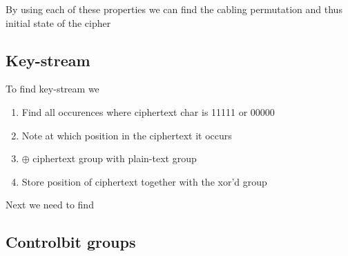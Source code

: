 \documentclass{article}
\begin{document}
By using each of these properties we can find the cabling permutation and thus initial state of the cipher

\subsection{Key-stream}

To find key-stream we
\begin{enumerate}
	\item Find all occurences where ciphertext char is 11111 or 00000
	\item Note at which position in the ciphertext it occurs
	\item $\oplus$ ciphertext group with plain-text group
	\item Store position of ciphertext together with the xor'd group
\end{enumerate}

Next we need to find 

\subsection{Controlbit groups}
\end{document}
